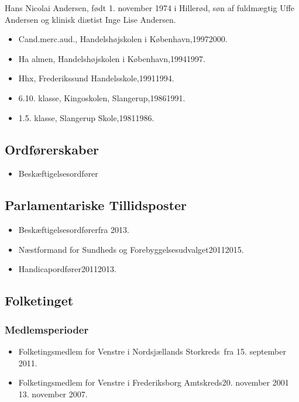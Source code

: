 \documentclass[11pt, a4paper]{awesome-cv}
\begin{document}
\makecvheader[R]
\makelettertitle
\begin{cvletter}
Hans Nicolai Andersen, født 1. november 1974 i Hillerød, søn af fuldmægtig Uffe Andersen og klinisk diætist Inge Lise Andersen.

\begin{itemize}
\item Cand.merc.aud., Handelshøjskolen i København,19972000.
\item Ha almen, Handelshøjskolen i København,19941997.
\item Hhx, Frederikssund Handelsskole,19911994.
\item 6.10. klasse, Kingoskolen, Slangerup,19861991.
\item 1.5. klasse, Slangerup Skole,19811986.
\end{itemize}
\subsection*{Ordførerskaber}
\begin{itemize}
\item Beskæftigelsesordfører
\end{itemize}
\subsection*{Parlamentariske Tillidsposter}
\begin{itemize}
\item Beskæftigelsesordførerfra 2013.
\item Næstformand for Sundheds og Forebyggelsesudvalget20112015.
\item Handicapordfører20112013.
\end{itemize}
\subsection*{Folketinget}
\subsubsection*{Medlemsperioder}
\begin{itemize}
\item Folketingsmedlem for Venstre i Nordsjællands Storkreds fra 15. september 2011.
\item Folketingsmedlem for Venstre i Frederiksborg Amtskreds20. november 2001  13. november 2007.
\end{itemize}

\end{cvletter}
\end{document}
